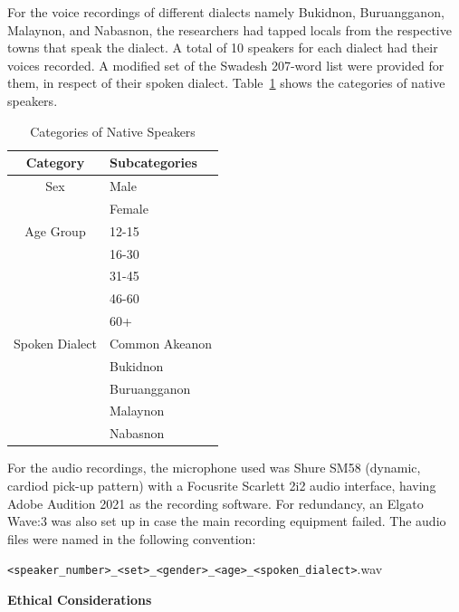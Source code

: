 For the voice recordings of different dialects namely Bukidnon, Buruangganon, Malaynon, and Nabasnon, the researchers had tapped locals from the respective towns that speak the dialect. A total of 10 speakers for each dialect had their voices recorded. A modified set of the Swadesh 207-word list were provided for them, in respect of their spoken dialect. Table~\ref{tab:native_speakers} shows the categories of native speakers. 

\begin{table}[H]
   \centering
   \caption{Categories of Native Speakers} \vspace{0.25em}
   \label{tab:native_speakers}
   \renewcommand{\arraystretch}{1.5} %
   \setlength{\tabcolsep}{10pt} %

\begin{tabular}{|c|p{2in}|} \hline
   \centering Category & Subcategories \\ \hline
   Sex & Male \\ 
   & Female \\ 
   \hline
   Age Group & 
   12-15 \\ 
   & 16-30 \\ 
   & 31-45 \\ 
   & 46-60 \\
   & 60+ \\ \hline
   Spoken Dialect & 
   Common Akeanon \\ 
   & Bukidnon \\ 
   & Buruangganon \\ 
   & Malaynon \\ 
   & Nabasnon \\ \hline
\end{tabular}
\end{table}

For the audio recordings, the microphone used was Shure SM58 (dynamic, cardiod pick-up pattern) with a Focusrite Scarlett 2i2 audio interface, having Adobe Audition 2021 as the recording software. For redundancy, an Elgato Wave:3 was also set up in case the main recording equipment failed. The audio files were named in the following convention: 

\texttt{\textless speaker\_number\textgreater\_\textless set\textgreater\_\textless gender\textgreater\_\textless age\textgreater\_\textless spoken\_dialect\textgreater}.wav

\textbf{Ethical Considerations}

